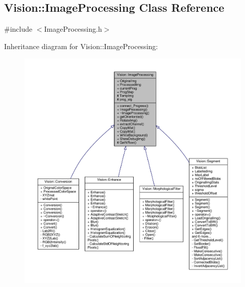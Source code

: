 \hypertarget{class_vision_1_1_image_processing}{}\subsection{Vision\+:\+:Image\+Processing Class Reference}
\label{class_vision_1_1_image_processing}


{\ttfamily \#include $<$Image\+Processing.\+h$>$}



Inheritance diagram for Vision\+:\+:Image\+Processing\+:
\nopagebreak
\begin{figure}[H]
\begin{center}
\leavevmode
\includegraphics[width=350pt]{class_vision_1_1_image_processing__inherit__graph}
\end{center}
\end{figure}


